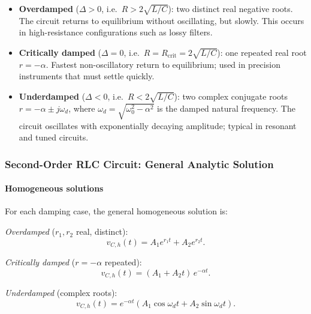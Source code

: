 \begin{itemize}
  \item \textbf{Overdamped} ($\Delta > 0$, i.e.\ $R > 2\sqrt{L/C}$):
        two distinct real negative roots.
        The circuit returns to equilibrium without oscillating, but slowly.
        This occurs in high-resistance configurations such as lossy filters.
  \item \textbf{Critically damped} ($\Delta = 0$, i.e.\ $R = R_\mathrm{crit} = 2\sqrt{L/C}$):
        one repeated real root $r = -\alpha$.
        Fastest non-oscillatory return to equilibrium; used in precision
        instruments that must settle quickly.
  \item \textbf{Underdamped} ($\Delta < 0$, i.e.\ $R < 2\sqrt{L/C}$):
        two complex conjugate roots $r = -\alpha \pm j\omega_d$, where
        $\omega_d = \sqrt{\omega_0^2 - \alpha^2}$ is the damped natural
        frequency.
        The circuit oscillates with exponentially decaying amplitude; typical
        in resonant and tuned circuits.
\end{itemize}

\subsubsection{Second-Order RLC Circuit: General Analytic Solution}

\paragraph{Homogeneous solutions}
For each damping case, the general homogeneous solution is:

\noindent\textit{Overdamped} ($r_1, r_2$ real, distinct):
\begin{equation}
  v_{C,h}(t) = A_1 e^{r_1 t} + A_2 e^{r_2 t}.
  \label{eq:over}
\end{equation}

\noindent\textit{Critically damped} ($r = -\alpha$ repeated):
\begin{equation}
  v_{C,h}(t) = (A_1 + A_2 t)\,e^{-\alpha t}.
  \label{eq:crit}
\end{equation}

\noindent\textit{Underdamped} (complex roots):
\begin{equation}
  v_{C,h}(t) = e^{-\alpha t}\!\left(A_1\cos\omega_d t + A_2\sin\omega_d t\right).
  \label{eq:under}
\end{equation}

